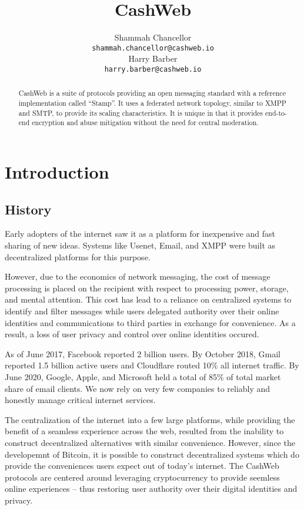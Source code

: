 \documentclass{article}
\title{CashWeb}
\author{
 Shammah Chancellor \\
 \texttt{shammah.chancellor@cashweb.io} \\
 \And
 Harry Barber \\
 \texttt{harry.barber@cashweb.io} \\
}
\begin{document}
\maketitle

\begin{abstract}
CashWeb is a suite of protocols providing an open messaging standard with a reference implementation called ``Stamp''. It uses a federated network topology, similar to XMPP and SMTP, to provide its scaling characteristics. It is unique in that it provides end-to-end encryption and abuse mitigation without the need for central moderation.
\end{abstract}

\section{Introduction}

\subsection{History}

Early adopters of the internet saw it as a platform for inexpensive and fast sharing of new ideas. Systems like Usenet\cite{rfc5536}\cite{rfc5537}, Email\cite{rfc5322}\cite{rfc1939}\cite{rfc5321}\cite{rfc4551}, and XMPP\cite{rfc3920}\cite{rfc3921}\cite{rfc3922}\cite{rfc3923} were built as decentralized platforms for this purpose.

However, due to the economics of network messaging, the cost of message processing is placed on the recipient with respect to processing power, storage, and mental attention. This cost has lead to a reliance on centralized systems to identify and filter messages while users delegated authority over their online identities and communications to third parties in exchange for convenience. As a result, a loss of user privacy and control over online identities occured.

As of June 2017, Facebook reported 2 billion users. By October 2018, Gmail reported 1.5 billion active users\cite{gmail2018} and Cloudflare routed 10\% all internet traffic\cite{cloudflare2018}. By June 2020, Google, Apple, and Microsoft held a total of 85\% of total market share of email clients\cite{emailshare2020}. We now rely on very few companies to reliably and honestly manage critical internet services.

The centralization of the internet into a few large platforms, while providing the benefit of a seamless experience across the web, resulted from the inability to construct decentralized alternatives with similar convenience. However, since the developemnt of Bitcoin\cite{nakamoto2008bpp}, it is possible to construct decentralized systems which do provide the conveniences users expect out of today's internet. The CashWeb protocols are centered around leveraging cryptocurrency to provide seemless online experiences -- thus restoring user authority over their digital identities and privacy. 
\end{document}
